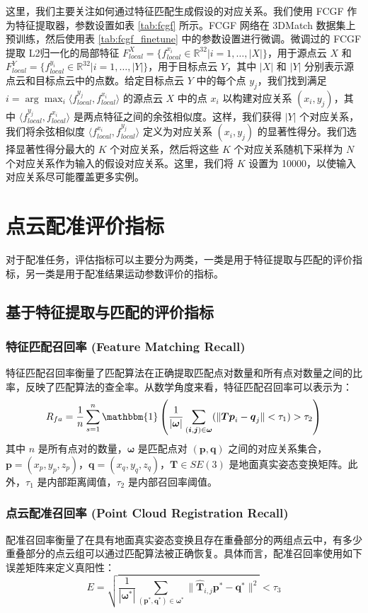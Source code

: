 这里，我们主要关注如何通过特征匹配生成假设的对应关系。我们使用 FCGF 作为特征提取器，参数设置如表 \ref{tab:fcgf} 所示。FCGF 网络在 3DMatch 数据集上预训练，然后使用表 \ref{tab:fcgf_finetune} 中的参数设置进行微调。微调过的 FCGF 提取 L2归一化的局部特征 $F_{local}^X = \{f_{local}^{x_i} \in \mathbb{R}^{32} | i = 1, \dots, |X|\}$，用于源点云 $X$ 和 $F_{local}^Y = \{f_{local}^{y_i} \in \mathbb{R}^{32} | i = 1, \dots, |Y|\}$，用于目标点云 $Y$，其中 $|X|$ 和 $|Y|$ 分别表示源点云和目标点云中的点数。给定目标点云 $Y$ 中的每个点 $y_j$，我们找到满足 $i = \arg\max_i \langle f_{local}^{y_j}, f_{local}^{x_i} \rangle$ 的源点云 $X$ 中的点 $x_i$ 以构建对应关系 $(x_i, y_j)$，其中 $\langle f_{local}^{y_j}, f_{local}^{x_i} \rangle$ 是两点特征之间的余弦相似度。这样，我们获得 $|Y|$ 个对应关系，我们将余弦相似度 $\langle f_{local}^{x_i}, f_{local}^{y_j} \rangle$ 定义为对应关系 $(x_i, y_j)$ 的显著性得分。我们选择显著性得分最大的 $K$ 个对应关系，然后将这些 $K$ 个对应关系随机下采样为 $N$ 个对应关系作为输入的假设对应关系。这里，我们将 $K$ 设置为 10000，以使输入对应关系尽可能覆盖更多实例。
\section{点云配准评价指标}
对于配准任务，评估指标可以主要分为两类，一类是用于特征提取与匹配的评价指标，另一类是用于配准结果运动参数评价的指标。
\subsection{基于特征提取与匹配的评价指标}
\subsubsection{特征匹配召回率 (Feature Matching Recall)}
特征匹配召回率衡量了匹配算法在正确提取匹配点对数量和所有点对数量之间的比率，反映了匹配算法的查全率。从数学角度来看，特征匹配召回率可以表示为：
\begin{equation}
R_{fa} = \frac{1}{n} \sum_{s=1}^{n} \mathbbm{1} \left( \frac{1}{|\boldsymbol{\omega}|} \sum_{(\boldsymbol{i},\boldsymbol{j})\in\boldsymbol{\omega}} (\lVert \boldsymbol{T}\boldsymbol{p}_i - \boldsymbol{q}_j \rVert < \tau_1) > \tau_2 \right)
\end{equation}
其中 $n$ 是所有点对的数量，$\boldsymbol{\omega}$ 是匹配点对 $(\boldsymbol{p}, \boldsymbol{q})$ 之间的对应关系集合，$\boldsymbol{p} = (x_p, y_p, z_p)$，$\boldsymbol{q} = (x_q, y_q, z_q)$，$\boldsymbol{T} \in SE(3)$ 是地面真实姿态变换矩阵。此外，$\tau_1$ 是内部距离阈值，$\tau_2$ 是内部召回率阈值。
\subsubsection{点云配准召回率 (Point Cloud Registration Recall)}
配准召回率衡量了在具有地面真实姿态变换且存在重叠部分的两组点云中，有多少重叠部分的点云组可以通过匹配算法被正确恢复。具体而言，配准召回率使用如下误差矩阵来定义真阳性：
\begin{equation}
    E = \sqrt{\frac{1}{|\boldsymbol{\omega}^*|} \sum_{(\boldsymbol{p}^*,\boldsymbol{q}^*)\in\boldsymbol{\omega}^*} \lVert \boldsymbol{\hat{T}}_{i,j}\boldsymbol{p}^* - \boldsymbol{q}^* \rVert^2} < \tau_3
\end{equation}
    
